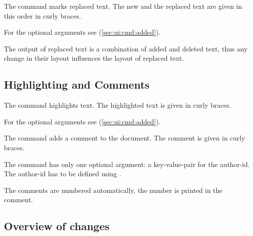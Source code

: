




The command  marks replaced text.
The new and the replaced text are given in this order in curly braces.

For the optional arguments see  (\autoref{sec:ui:cmd:added}).

The output of replaced text is a combination of added and deleted text, thus any change in their layout influences the layout of replaced text.




\subsection{Highlighting and Comments}
\label{sec:ui:comment}

\localtableofcontents



The command  highlights text.
The highlighted text is given in curly braces.

For the optional arguments see  (\autoref{sec:ui:cmd:added}).





The command  adds a comment to the document.
The comment is given in curly braces.

The command has only one optional argument: a key-value-pair for the author-id.
The author-id has to be defined using .

The comments are numbered automatically, the number is printed in the comment.





\subsection{Overview of changes}
\label{sec:ui:overview}


